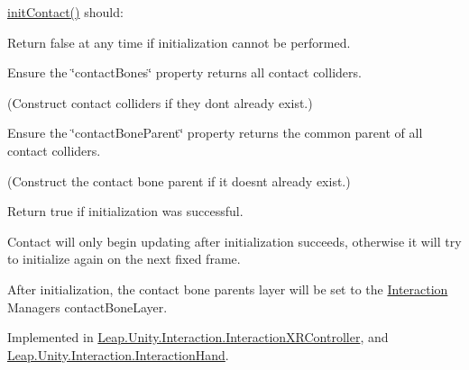 \mbox{\hyperlink{class_leap_1_1_unity_1_1_interaction_1_1_interaction_controller_a5d9713dd48f3093aefbd8ebbba3b0251}{init\+Contact()}} should\+:
\begin{DoxyItemize}
\item Return false at any time if initialization cannot be performed.
\item Ensure the \char`\"{}contact\+Bones\char`\"{} property returns all contact colliders.
\begin{DoxyItemize}
\item (Construct contact colliders if they don\textquotesingle{}t already exist.)
\end{DoxyItemize}
\item Ensure the \char`\"{}contact\+Bone\+Parent\char`\"{} property returns the common parent of all contact colliders.
\begin{DoxyItemize}
\item (Construct the contact bone parent if it doesn\textquotesingle{}t already exist.)
\end{DoxyItemize}
\item Return true if initialization was successful.
\end{DoxyItemize}

Contact will only begin updating after initialization succeeds, otherwise it will try to initialize again on the next fixed frame.

After initialization, the contact bone parent\textquotesingle{}s layer will be set to the \mbox{\hyperlink{namespace_leap_1_1_unity_1_1_interaction}{Interaction}} Manager\textquotesingle{}s contact\+Bone\+Layer. 

Implemented in \mbox{\hyperlink{class_leap_1_1_unity_1_1_interaction_1_1_interaction_x_r_controller_a6646ebf671991c5bc47a66b2129538b6}{Leap.\+Unity.\+Interaction.\+Interaction\+X\+R\+Controller}}, and \mbox{\hyperlink{class_leap_1_1_unity_1_1_interaction_1_1_interaction_hand_a01581c96fd67f53a9b8a6ddc36e0709c}{Leap.\+Unity.\+Interaction.\+Interaction\+Hand}}.

\mbox{\label{class_leap_1_1_unity_1_1_interaction_1_1_interaction_controller_a08ba5639e6af985fa056a25ff2981278}} 
